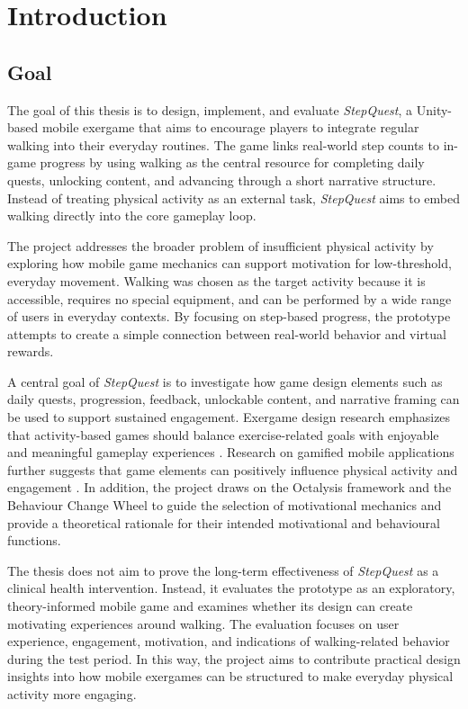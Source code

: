 \chapter{Introduction}

\section{Goal}

The goal of this thesis is to design, implement, and evaluate \textit{\textit{StepQuest}}, a Unity-based mobile exergame that aims to encourage players to integrate regular walking into their everyday routines. The game links real-world step counts to in-game progress by using walking as the central resource for completing daily quests, unlocking content, and advancing through a short narrative structure. Instead of treating physical activity as an external task, \textit{StepQuest} aims to embed walking directly into the core gameplay loop.

The project addresses the broader problem of insufficient physical activity by exploring how mobile game mechanics can support motivation for low-threshold, everyday movement. Walking was chosen as the target activity because it is accessible, requires no special equipment, and can be performed by a wide range of users in everyday contexts. By focusing on step-based progress, the prototype attempts to create a simple connection between real-world behavior and virtual rewards.

A central goal of \textit{StepQuest} is to investigate how game design elements such as daily quests, progression, feedback, unlockable content, and narrative framing can be used to support sustained engagement. Exergame design research emphasizes that activity-based games should balance exercise-related goals with enjoyable and meaningful gameplay experiences \cite{10.1145/1321261.1321313,Kubota2022Pilot}. Research on gamified mobile applications further suggests that game elements can positively influence physical activity and engagement \cite{Yang2022GamifiedAppsPA}. In addition, the project draws on the Octalysis framework \cite{octalysis,key} and the Behaviour Change Wheel \cite{bcw2011} to guide the selection of motivational mechanics and provide a theoretical rationale for their intended motivational and behavioural functions.

The thesis does not aim to prove the long-term effectiveness of \textit{StepQuest} as a clinical health intervention. Instead, it evaluates the prototype as an exploratory, theory-informed mobile game and examines whether its design can create motivating experiences around walking. The evaluation focuses on user experience, engagement, motivation, and indications of walking-related behavior during the test period. In this way, the project aims to contribute practical design insights into how mobile exergames can be structured to make everyday physical activity more engaging.

